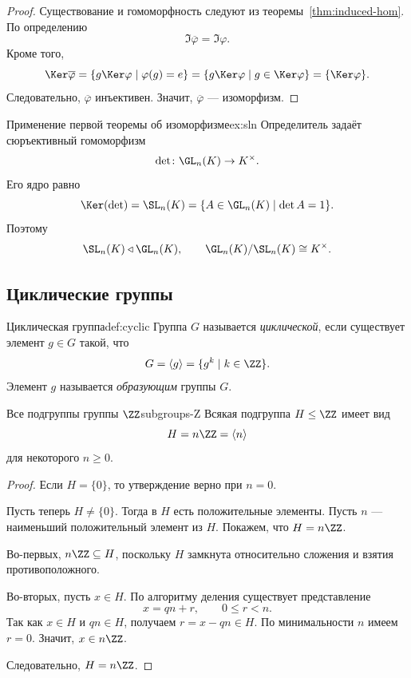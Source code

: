 \begin{proof}
	Существование и гомоморфность следуют из теоремы~\ref{thm:induced-hom}. По определению
	\[
	\Im\overline\varphi=\Im\varphi.
	\]
	Кроме того,
	\[
	\Ker\overline\varphi = \{g\Ker\varphi \mid \varphi(g)=e\} = \{g\Ker\varphi \mid g\in \Ker\varphi\} = \{\Ker\varphi\}.
	\]
	Следовательно, $\overline\varphi$ инъективен. Значит, $\overline\varphi$ --- изоморфизм.
\end{proof}

\begin{Example}{Применение первой теоремы об изоморфизме}{ex:sln}
	Определитель задаёт сюръективный гомоморфизм
	\[
	\det\colon \GL_n(K)\to K^{\times}.
	\]
	Его ядро равно
	\[
	\Ker(\det)=\SL_n(K)=\{A\in \GL_n(K)\mid \det A=1\}.
	\]
	Поэтому
	\[
	\SL_n(K)\triangleleft \GL_n(K),
	\qquad
	\GL_n(K)/\SL_n(K)\cong K^{\times}.
	\]
\end{Example}

\subsection{Циклические группы}

\begin{Definition}{Циклическая группа}{def:cyclic}
	Группа $G$ называется \emph{циклической}, если существует элемент $g\in G$ такой, что
	\[
	G=\langle g\rangle = \{g^k\mid k\in \ZZ\}.
	\]
	Элемент $g$ называется \emph{образующим} группы $G$.
\end{Definition}

\begin{Theorem}{Все подгруппы группы $\ZZ$}{subgroups-Z}
	Всякая подгруппа $H\le \ZZ$ имеет вид
	\[
	H=n\ZZ=\langle n\rangle
	\]
	для некоторого $n\ge 0$.
\end{Theorem}

\begin{proof}
	Если $H=\{0\}$, то утверждение верно при $n=0$.
	
	Пусть теперь $H\ne\{0\}$. Тогда в $H$ есть положительные элементы. Пусть $n$ --- наименьший положительный элемент из $H$. Покажем, что $H=n\ZZ$.
	
	Во-первых, $n\ZZ\subseteq H$, поскольку $H$ замкнута относительно сложения и взятия противоположного.
	
	Во-вторых, пусть $x\in H$. По алгоритму деления существует представление
	\[
	x=qn+r, \qquad 0\le r<n.
	\]
	Так как $x\in H$ и $qn\in H$, получаем $r=x-qn\in H.$
	По минимальности $n$ имеем $r=0$. Значит, $x\in n\ZZ$.
	
	Следовательно, $H=n\ZZ$.
\end{proof}

